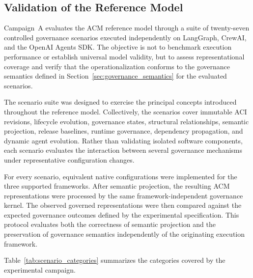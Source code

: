 \documentclass[10pt]{article}
\begin{document}
\subsection{Validation of the Reference Model}
\label{sec:reference_model_validation}

Campaign~A evaluates the ACM reference model through a suite of twenty-seven controlled governance scenarios executed independently on LangGraph, CrewAI, and the OpenAI Agents SDK. The objective is not to benchmark execution performance or establish universal model validity, but to assess representational coverage and verify that the operationalization conforms to the governance semantics defined in Section~\ref{sec:governance_semantics} for the evaluated scenarios.

The scenario suite was designed to exercise the principal concepts introduced throughout the reference model. Collectively, the scenarios cover immutable ACI revisions, lifecycle evolution, governance states, structural relationships, semantic projection, release baselines, runtime governance, dependency propagation, and dynamic agent evolution. Rather than validating isolated software components, each scenario evaluates the interaction between several governance mechanisms under representative configuration changes.

For every scenario, equivalent native configurations were implemented for the three supported frameworks. After semantic projection, the resulting ACM representations were processed by the same framework-independent governance kernel. The observed governed representations were then compared against the expected governance outcomes defined by the experimental specification. This protocol evaluates both the correctness of semantic projection and the preservation of governance semantics independently of the originating execution framework.

Table~\ref{tab:scenario_categories} summarizes the categories covered by the experimental campaign.
\end{document}
